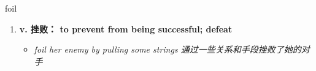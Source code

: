 
\begin{frame}
{\huge foil}
\begin{center}
\begin{enumerate}\Large
  \item \textbf{v. 挫败： to prevent from being successful; defeat}
  \begin{itemize}
    \item \em{\Large{foil her enemy by pulling some strings 通过一些关系和手段挫败了她的对手}}
  \end{itemize}
\end{enumerate}
\end{center}
\end{frame}
